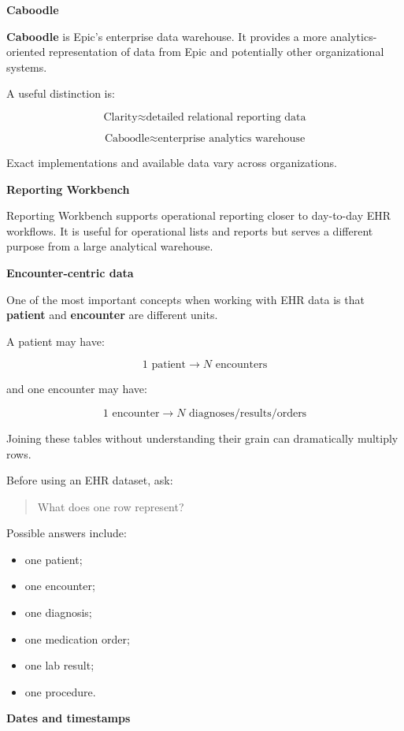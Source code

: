\documentclass[11pt,letterpaper]{article}
\begin{document}
\textbf{Caboodle}

\textbf{Caboodle} is Epic's enterprise data warehouse. It provides a more
analytics-oriented representation of data from Epic and potentially other
organizational systems.

A useful distinction is:

\[
\text{Clarity}
\approx
\text{detailed relational reporting data}
\]

\[
\text{Caboodle}
\approx
\text{enterprise analytics warehouse}
\]

Exact implementations and available data vary across organizations.

\textbf{Reporting Workbench}

Reporting Workbench supports operational reporting closer to day-to-day EHR
workflows. It is useful for operational lists and reports but serves a
different purpose from a large analytical warehouse.

\textbf{Encounter-centric data}

One of the most important concepts when working with EHR data is that
\textbf{patient} and \textbf{encounter} are different units.

A patient may have:

\[
1 \text{ patient}
\rightarrow
N \text{ encounters}
\]

and one encounter may have:

\[
1 \text{ encounter}
\rightarrow
N \text{ diagnoses/results/orders}
\]

Joining these tables without understanding their grain can dramatically
multiply rows.

Before using an EHR dataset, ask:

\begin{quote}
What does one row represent?
\end{quote}

Possible answers include:

\begin{itemize}[leftmargin=*]
    \item one patient;
    \item one encounter;
    \item one diagnosis;
    \item one medication order;
    \item one lab result;
    \item one procedure.
\end{itemize}

\textbf{Dates and timestamps}
\end{document}
